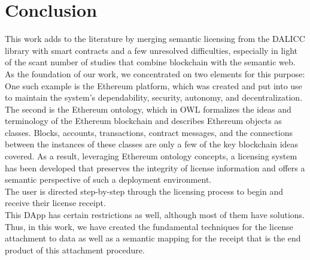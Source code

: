 \chapter{Conclusion}
This work adds to the literature by merging semantic licensing from the DALICC library with smart contracts and a few unresolved difficulties, especially in light of the scant number of studies that combine blockchain with the semantic web.\\
 As the foundation of our work, we concentrated on two elements for this purpose: \\
One such example is the Ethereum platform, which was created and put into use to maintain the system's dependability, security, autonomy, and decentralization. 
The second is the Ethereum ontology, which in OWL formalizes the ideas and terminology of the Ethereum blockchain and describes Ethereum objects as classes. Blocks, accounts, transactions, contract messages, and the connections between the instances of these classes are only a few of the key blockchain ideas covered.
As a result, leveraging Ethereum ontology concepts, a licensing system has been developed that preserves the integrity of license information and offers a semantic perspective of such a deployment environment.\\ 
The user is directed step-by-step through the licensing process to begin and receive their license receipt. \\
This DApp has certain restrictions as well, although most of them have solutions. Thus, in this work, we have created the fundamental techniques for the license attachment to data as well as a semantic mapping for the receipt that is the end product of this attachment procedure.

